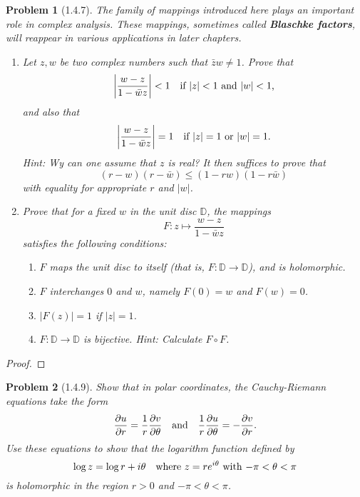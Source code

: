 \documentclass[10pt]{article}
\newcommand{\sk}{\vskip 10mm}
\newcommand{\bb}[1]{\mathbb{#1}}
\theoremstyle{plain}
\newtheorem{problem}{Problem}
\theoremstyle{remark}
\begin{document}
\begin{problem}[1.4.7]
  The family of mappings introduced here plays an important role in complex
  analysis. These mappings, sometimes called \textbf{Blaschke factors},
  will reappear in various applications in later chapters.
  \begin{enumerate}
  \item[(a)] Let $z,w$ be two complex numbers such that $\bar{z}w\neq 1$.
    Prove that
    \[
      \left|
        \frac{w-z}{1-\bar{w}z}
      \right|
      <1 \text{\quad if $|z|<1$ and $|w| <1$,}
    \]
    and also that
    \[
      \left|
        \frac{w-z}{1-\bar{w}z}
      \right|
      = 1 \text{\quad if $|z|=1$ or $|w|=1$}.
    \]
    Hint: Wy can one assume that $z$ is real? It then suffices to prove that
    \[
      (r-w)(r-\bar{w})\leq (1-rw)(1-r\bar{w})
    \]
    with equality for appropriate $r$ and $|w|$.
  \item[(b)] Prove that for a fixed $w$ in the unit disc $\bb{D}$, the mappings
    \[
      F:z\mapsto \frac{w-z}{1-\bar{w}z}
    \]
    satisfies the following conditions:
    \begin{enumerate}
    \item[(i)] $F$ maps the unit disc to itself (that is,
      $F:\bb{D}\rightarrow\bb{D}$), and is holomorphic.
    \item[(ii)] $F$ interchanges $0$ and $w$, namely $F(0)=w$ and $F(w)=0$.
    \item[(iii)] $|F(z)|=1$ if $|z|=1$.
    \item[(iv)] $F:\bb{D}\rightarrow \bb{D}$ is bijective.
      Hint: Calculate $F\circ F$.
    \end{enumerate}
  \end{enumerate}
\end{problem}

\begin{proof}
  
\end{proof}

\sk

\begin{problem}[1.4.9]
  Show that in polar coordinates, the Cauchy-Riemann equations take the form
  \[
    \frac{\partial u}{\partial r}=\frac{1}{r}\frac{\partial v}{\partial\theta} \text{\quad and\quad} \frac{1}{r}\frac{\partial u}{\partial\theta}=-\frac{\partial v}{\partial r}.
  \]
  Use these equations to show that the logarithm function defined by
  \[
    \log z = \log r + i\theta \text{\quad  where $z=re^{i\theta}$ with $-\pi<\theta<\pi$}
  \]
  is holomorphic in the region $r>0$ and $-\pi<\theta<\pi$.
\end{problem}
\end{document}
